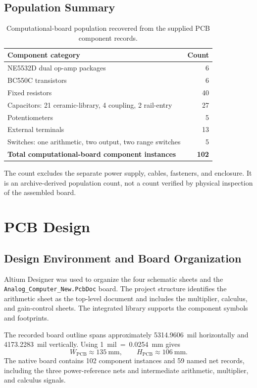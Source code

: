 \documentclass[11pt,a4paper]{article}
\begin{document}
\subsection{Population Summary}
\begin{table}[htbp]
\centering
\caption{Computational-board population recovered from the supplied PCB component records.}
\begin{tabular}{lr}
\toprule
\textbf{Component category} & \textbf{Count}\\
\midrule
NE5532D dual op-amp packages & 6\\
BC550C transistors & 6\\
Fixed resistors & 40\\
Capacitors: 21 ceramic-library, 4 coupling, 2 rail-entry & 27\\
Potentiometers & 5\\
External terminals & 13\\
Switches: one arithmetic, two output, two range switches & 5\\
\midrule
\textbf{Total computational-board component instances} & \textbf{102}\\
\bottomrule
\end{tabular}
\end{table}
The count excludes the separate power supply, cables, fasteners, and enclosure. It is an archive-derived population count, not a count verified by physical inspection of the assembled board.

\section{PCB Design}
\subsection{Design Environment and Board Organization}
Altium Designer was used to organize the four schematic sheets and the \texttt{Analog\_\allowbreak{}Computer\_\allowbreak{}New.PcbDoc} board. The project structure identifies the arithmetic sheet as the top-level document and includes the multiplier, calculus, and gain-control sheets. The integrated library supports the component symbols and footprints.

The recorded board outline spans approximately 5314.9606~mil horizontally and 4173.2283~mil vertically. Using 1~mil~=~0.0254~mm gives
\begin{equation}
\boxed{W_{\mathrm{PCB}}\approx135~\mathrm{mm},\qquad
H_{\mathrm{PCB}}\approx106~\mathrm{mm}.}
\end{equation}
The native board contains 102 component instances and 59 named net records, including the three power-reference nets and intermediate arithmetic, multiplier, and calculus signals.
\end{document}
